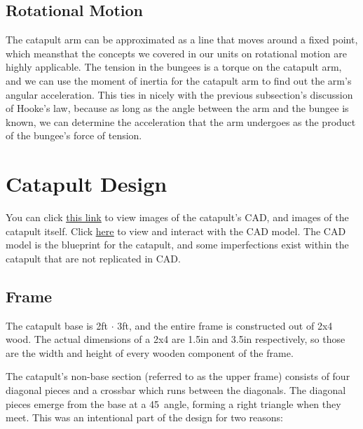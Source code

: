\documentclass[10pt]{article}
\begin{document}
\begin{flushleft}
  \subsection{Rotational Motion}
    The catapult arm can be approximated as a line that moves around a fixed point, which meansthat the concepts we covered in our units on rotational motion are highly applicable.
    The tension in the bungees is a torque on the catapult arm, and we can use the moment of inertia for the catapult arm to find out the arm's angular acceleration.
    This ties in nicely with the previous subsection's discussion of Hooke's law, because as long as the angle between the arm and the bungee is known, we can determine the acceleration that the arm undergoes as the product of the bungee's force of tension.


\section{Catapult Design}
  
  You can click \href{https://imgur.com/a/iidlyPC}{\underline{this link}} to view images of the catapult's CAD, and images of the catapult itself.
  Click \href{https://cad.onshape.com/documents/a21afbbb73f6dd6201e3b395/w/34e6c49428357ac916a3dcfd/e/86ecc9ec480ab3b6357f0414?renderMode=0&uiState=643624c739388d13bb3344de}{\underline{here}} to view and interact with the CAD model.
  The CAD model is the blueprint for the catapult, and some imperfections exist within the catapult that are not replicated in CAD.

  \subsection{Frame}
    The catapult base is 2ft $\cdot $ 3ft, and the entire frame is constructed out of 2x4 wood.
    The actual dimensions of a 2x4 are 1.5in and 3.5in respectively, so those are the width and height of every wooden component of the frame.

    \par
    The catapult's non-base section (referred to as the upper frame) consists of four diagonal pieces and a crossbar which runs between the diagonals.
    The diagonal pieces emerge from the base at a 45\textdegree \ angle, forming a right triangle when they meet.
    This was an intentional part of the design for two reasons:


\end{flushleft}
\end{document}
